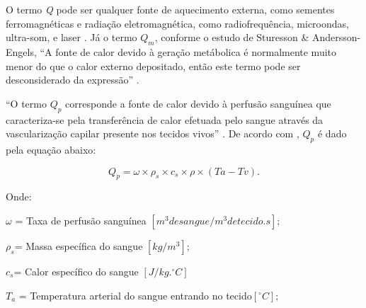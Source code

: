 O termo {\itshape Q} pode ser qualquer fonte de aquecimento externa, como sementes ferromagnéticas e radiação eletromagnética, como radiofrequência, microondas, ultra-som, e laser \cite[p.10]{Giselle}. Já o termo {\itshape $Q_{m}$}, conforme o estudo de  Sturesson \& Andersson-Engels, ``A  fonte de calor devido à geração metábolica é normalmente muito menor do que o calor externo depositado, então este termo pode ser desconsiderado da expressão'' . %

       ``O termo {\itshape $Q_{p}$} corresponde a fonte de calor devido à perfusão sanguínea que caracteriza-se pela transferência de calor efetuada pelo sangue através da vascularização capilar presente nos tecidos vivos'' \cite{Carla}.%
       De acordo com \cite{Giselle},  {\itshape $Q_{p}$} é dado pela equação abaixo:


    \begin{equation} Q_{p}= \omega\times\rho_{s}\times c_{s}\times\rho\times(Ta-Tv).\end{equation} 

       Onde:

       $\omega$ = Taxa de perfusão sanguínea $[m^3 de sangue/m^3 de tecido.s];$

      $ \rho_{s} $= Massa específica do sangue $[kg/m^3];$

        $c_{s} $= Calor específico do sangue  $[J/kg.^{\circ}C]$

        $T_{a}$ = Temperatura arterial do sangue entrando no tecido$ [^{\circ}C];$

